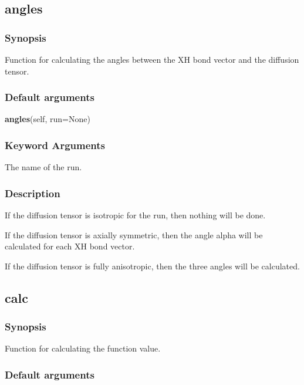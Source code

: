 

\newpage

\subsection{angles}


\subsubsection{Synopsis}

Function for calculating the angles between the XH bond vector and the diffusion tensor.

\subsubsection{Default arguments}

\textsf{\textbf{angles}(self, run=None)}


\subsubsection{Keyword Arguments}

  The name of the run.

\subsubsection{Description}

If the diffusion tensor is isotropic for the run, then nothing will be done.

If the diffusion tensor is axially symmetric, then the angle alpha will be calculated for
each XH bond vector.

If the diffusion tensor is fully anisotropic, then the three angles will be calculated.


\newpage

\subsection{calc}


\subsubsection{Synopsis}

Function for calculating the function value.

\subsubsection{Default arguments}

